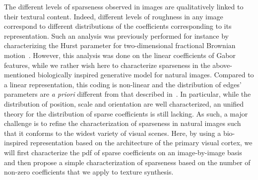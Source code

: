 \documentclass[a4paper, 10pt, twocolumns]{article}
\begin{document}
The different levels of sparseness observed in images are qualitatively linked to their textural content. Indeed, different levels of roughness in any image correspond to different distributions of the coefficients corresponding to its representation. Such an analysis was previously performed for instance by characterizing the Hurst parameter for two-dimensional fractional Brownian motion~\citep{Kaplan1999}. However, this analysis was done on the linear coefficients of Gabor features, while we rather wish here to characterize sparseness in the above-mentioned biologically inspired generative model for natural images. Compared to a linear representation, this coding is non-linear and the distribution of edges' parameters are \emph{a priori} different from that described in~\citep{Kaplan1999}. In particular, while the distribution of position, scale and orientation are well characterized, an unified theory for the distribution of sparse coefficients is still lacking. As such, a major challenge is to refine the characterization of sparseness in natural images such that it conforms to the widest variety of visual scenes. Here, by using a bio-inspired representation based on the architecture of the primary visual cortex, we will first characterize the pdf of sparse coefficients on an image-by-image basis and then propose a simple characterization of sparseness based on the number of non-zero coefficients that we apply to texture synthesis.
\end{document}
